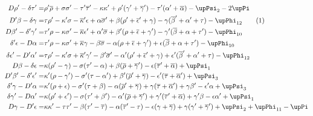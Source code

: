 {\begin{align*}
		D\rho '-\delta \tau '= & \rho '\overline{\rho } +\sigma \sigma '-\tau '\overline{\tau } '-\kappa \kappa '+\rho '( \gamma '+\overline{\gamma } ') -\tau '( \alpha '+\overline{\alpha }) -\upPsi _{2} -2\upPi \\
		D'\beta -\delta \gamma = & \tau \rho '-\kappa '\sigma -\overline{\kappa } '\epsilon +\alpha \overline{\sigma } '+\beta ( \rho '+\overline{\epsilon } '+\gamma ) -\gamma (\overline{\beta } '+\alpha '+\tau ) -\upPhi _{12} \stepcounter{equation}\tag{\theequation}\label{eq:5.79}\\
		D\beta '-\delta '\gamma '= & \tau '\rho -\kappa \sigma '-\overline{\kappa } \epsilon '+\alpha '\overline{\sigma } +\beta '( \rho +\overline{\epsilon } +\gamma ') -\gamma '(\overline{\beta } +\alpha +\tau ') -\upPhi _{10}\\
		\delta '\epsilon -D\alpha = & \tau '\rho -\kappa \sigma '+\overline{\kappa } \gamma -\beta \overline{\sigma } -\alpha ( \rho +\overline{\epsilon } +\gamma ') +\epsilon (\overline{\beta } +\alpha +\tau ') -\upPhi _{10}\\
		\delta \epsilon '-D'\alpha '= & \tau \rho '-\kappa '\sigma +\overline{\kappa } '\gamma '-\beta '\overline{\sigma } '-\alpha '( \rho '+\overline{\epsilon } '+\gamma ) +\epsilon '(\overline{\beta } '+\alpha '+\tau ) -\upPhi _{12}\\
		D\beta -\delta \epsilon = & \kappa ( \rho '-\gamma ) -\sigma ( \tau '-\alpha ) +\beta (\overline{\rho } +\overline{\gamma } ') -\epsilon (\overline{\tau } '+\overline{\alpha }) +\upPsi _{1}\\
		D'\beta '-\delta '\epsilon '= & \kappa '( \rho -\gamma ') -\sigma '( \tau -\alpha ') +\beta '(\overline{\rho } '+\overline{\gamma }) -\epsilon '(\overline{\tau } +\overline{\alpha } ') +\upPsi _{3}\\
		\delta '\gamma -D'\alpha = & \kappa '(\rho +\epsilon )-\sigma '(\tau +\beta )-\alpha (\overline{\rho } '+\overline{\gamma }) +\gamma (\overline{\tau } +\overline{\alpha } ') +\gamma \beta '-\epsilon '\alpha +\upPsi _{3}\\
		\delta \gamma '-D\alpha '= & \kappa ( \rho '+\epsilon ') -\sigma ( \tau '+\beta ') -\alpha '(\overline{\rho } +\overline{\gamma } ') +\gamma '(\overline{\tau } '+\overline{\alpha }) +\gamma '\beta -\epsilon \alpha '+\upPsi _{1}\\
		D\gamma -D'\epsilon = & \kappa \kappa '-\tau \tau '-\beta ( \tau '-\overline{\tau }) -\alpha (\overline{\tau } '-\tau ) -\epsilon (\gamma +\overline{\gamma } )+\gamma ( \gamma '+\overline{\gamma } ') +\upPsi _{2} +\upPhi _{11} -\upPi \\

\end{align*}}
